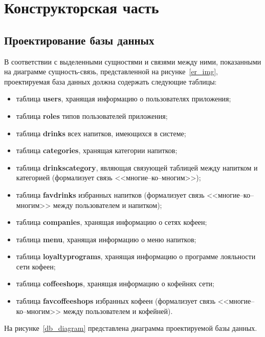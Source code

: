 \chapter{Конструкторская часть}

\section{Проектирование базы данных}
В соответствии с выделенными сущностями и связями между ними, показанными на диаграмме сущность-связь, представленной на рисунке~\ref{er_img}, проектируемая база данных должна содержать следующие таблицы:
\begin{itemize}
	\item таблица \textbf{users}, хранящая информацию о пользователях приложения;
	\item таблица \textbf{roles} типов пользователей приложения;
	\item таблица \textbf{drinks} всех напитков, имеющихся в системе;
	\item таблица \textbf{categories}, хранящая категории напитков;
	\item таблица \textbf{drinkscategory}, являющая связующей таблицей между напитком и категорией (формализует связь <<многие--ко--многим>>);
	\item таблица \textbf{favdrinks} избранных напитков (формализует связь <<многие--ко--многим>> между пользователем и напитком);
	\item таблица \textbf{companies}, хранящая информацию о сетях кофеен;
	\item таблица \textbf{menu}, хранящая информацию о меню напитков;
	\item таблица \textbf{loyaltyprograms}, хранящая информацию о программе лояльности сети кофеен;

	\item таблица \textbf{coffeeshops}, хранящая информацию о кофейнях сети;
	\item таблица \textbf{favcoffeeshops} избранных кофеен (формализует связь <<многие--ко--многим>> между пользователем и кофейней).
\end{itemize}

На рисунке~\ref{db_diagram} представлена диаграмма проектируемой базы данных.

\newpage


